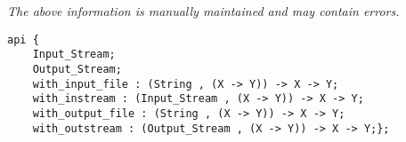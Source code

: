 \label{api:Io\_With}

{\tiny \it The above information is manually maintained and may contain errors.}
\begin{verbatim}
api {
    Input_Stream;
    Output_Stream;
    with_input_file : (String , (X -> Y)) -> X -> Y;
    with_instream : (Input_Stream , (X -> Y)) -> X -> Y;
    with_output_file : (String , (X -> Y)) -> X -> Y;
    with_outstream : (Output_Stream , (X -> Y)) -> X -> Y;};
\end{verbatim}
